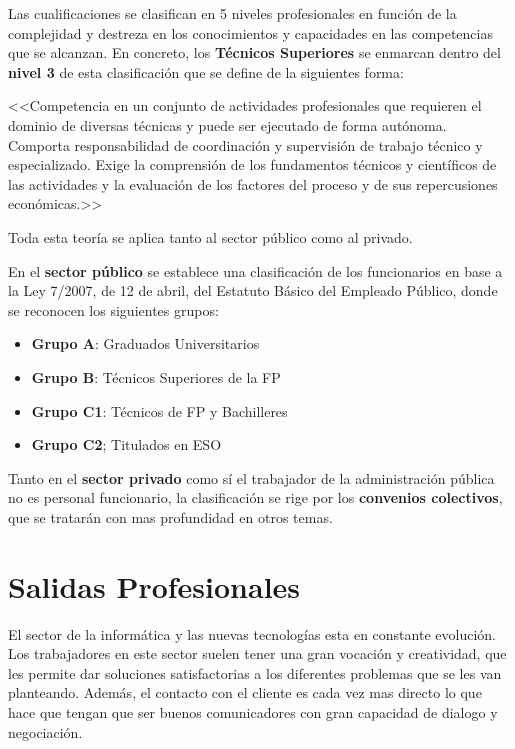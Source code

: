 Las cualificaciones se clasifican en 5 niveles profesionales en función de la complejidad y destreza en los conocimientos y capacidades en las competencias que se alcanzan. En concreto, los \textbf{Técnicos Superiores} se enmarcan dentro del\textbf{ nivel 3} de esta clasificación que se define de la siguientes forma:

<<Competencia en un conjunto de actividades profesionales que requieren el dominio de diversas técnicas y puede ser ejecutado de forma autónoma. Comporta responsabilidad de coordinación y supervisión de trabajo técnico y especializado. Exige la comprensión de los fundamentos técnicos y científicos de las actividades y la evaluación de los factores del proceso y de sus repercusiones económicas.>>

Toda esta teoría se aplica tanto al sector público como al privado.

En el \textbf{sector público} se establece una clasificación de los funcionarios en base a la Ley 7/2007, de 12 de abril, del Estatuto Básico del Empleado Público, donde se reconocen los siguientes grupos:

\begin{itemize}
    \item \textbf{Grupo A}: Graduados Universitarios
    \item \textbf{Grupo B}: Técnicos Superiores de la FP
    \item \textbf{Grupo C1}: Técnicos de FP y Bachilleres
    \item \textbf{Grupo C2}; Titulados en ESO
\end{itemize}

Tanto en el {\bfseries sector privado} como sí el trabajador de la administración pública no es personal funcionario, la clasificación se rige por los \textbf{\gls{convenios colectivos}}, que se tratarán con mas profundidad en otros temas.

\section{Salidas Profesionales}
El sector de la informática y las nuevas tecnologías esta en constante evolución. Los trabajadores en este sector suelen tener una gran vocación y creatividad, que les permite dar soluciones satisfactorias a los diferentes problemas que se les van planteando. Además, el contacto con el cliente es cada vez mas directo lo que hace que tengan que ser buenos comunicadores con gran capacidad de dialogo y negociación.

